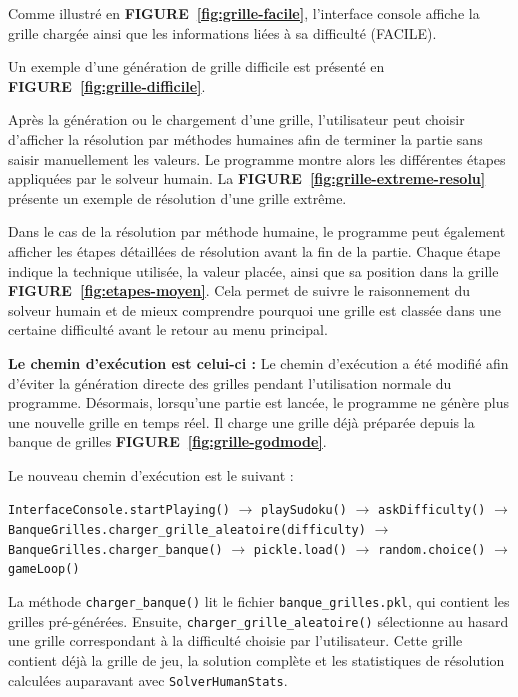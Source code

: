 \documentclass[a4paper]{article}
\begin{document}
Comme illustré en \textbf{FIGURE~\ref{fig:grille-facile}}, l'interface console affiche la grille chargée ainsi que les informations liées à sa difficulté (FACILE).

Un exemple d'une génération de grille difficile est présenté en \textbf{FIGURE~\ref{fig:grille-difficile}}.

Après la génération ou le chargement d'une grille, l'utilisateur peut choisir d'afficher la résolution par méthodes humaines afin de terminer la partie sans saisir manuellement les valeurs. 
Le programme montre alors les différentes étapes appliquées par le solveur humain. 
La \textbf{FIGURE~\ref{fig:grille-extreme-resolu}} présente un exemple de résolution d'une grille extrême.


Dans le cas de la résolution par méthode humaine, le programme peut également afficher les étapes détaillées de résolution avant la fin de la partie. 
Chaque étape indique la technique utilisée, la valeur placée, ainsi que sa position dans la grille \textbf{FIGURE~\ref{fig:etapes-moyen}}. 
Cela permet de suivre le raisonnement du solveur humain et de mieux comprendre pourquoi une grille est classée dans une certaine difficulté avant le retour au menu principal.


\textbf{Le chemin d’exécution est celui-ci :}
Le chemin d'exécution a été modifié afin d'éviter la génération directe des grilles pendant l'utilisation normale du programme. 
Désormais, lorsqu'une partie est lancée, le programme ne génère plus une nouvelle grille en temps réel. 
Il charge une grille déjà préparée depuis la banque de grilles \textbf{FIGURE~\ref{fig:grille-godmode}}.

Le nouveau chemin d'exécution est le suivant :

\begin{center}
\texttt{InterfaceConsole.startPlaying()} 
$\rightarrow$ \texttt{playSudoku()} 
$\rightarrow$ \texttt{askDifficulty()} 
$\rightarrow$ \texttt{BanqueGrilles.charger\_grille\_aleatoire(difficulty)}
$\rightarrow$ \texttt{BanqueGrilles.charger\_banque()}
$\rightarrow$ \texttt{pickle.load()}
$\rightarrow$ \texttt{random.choice()}
$\rightarrow$ \texttt{gameLoop()}
\end{center}

La méthode \texttt{charger\_banque()} lit le fichier \texttt{banque\_grilles.pkl}, qui contient les grilles pré-générées. 
Ensuite, \texttt{charger\_grille\_aleatoire()} sélectionne au hasard une grille correspondant à la difficulté choisie par l'utilisateur. 
Cette grille contient déjà la grille de jeu, la solution complète et les statistiques de résolution calculées auparavant avec \texttt{SolverHumanStats}.
\end{document}

